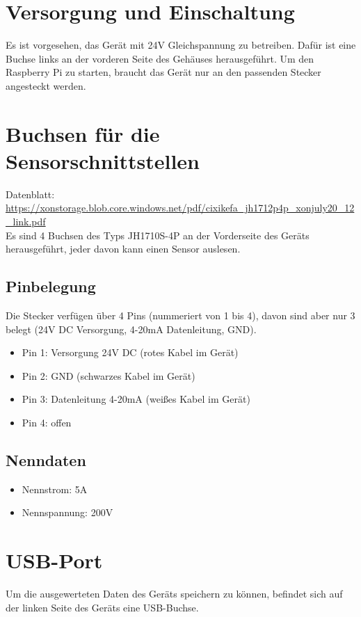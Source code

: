 \section{Versorgung und Einschaltung}

Es ist vorgesehen, das Gerät mit 24V Gleichspannung zu betreiben.
Dafür ist eine Buchse links an der vorderen Seite des Gehäuses herausgeführt.
Um den Raspberry Pi zu starten, braucht das Gerät nur an den passenden Stecker angesteckt werden.

\section{Buchsen für die Sensorschnittstellen}

Datenblatt: \url{https://xonstorage.blob.core.windows.net/pdf/cixikefa_jh1712p4p_xonjuly20_12_link.pdf}\\[0.5cm]
Es sind 4 Buchsen des Typs JH1710S-4P an der Vorderseite des Geräts herausgeführt, jeder davon kann einen Sensor auslesen.

\subsection{Pinbelegung}
Die Stecker verfügen über 4 Pins (nummeriert von 1 bis 4), davon sind aber nur 3  belegt (24V DC Versorgung, 4-20mA Datenleitung, GND).

\begin{itemize}
    \item Pin 1: Versorgung 24V DC (rotes Kabel im Gerät)
    \item Pin 2: GND (schwarzes Kabel im Gerät)
    \item Pin 3: Datenleitung 4-20mA (weißes Kabel im Gerät)
    \item Pin 4: offen
\end{itemize}



\subsection{Nenndaten}

\begin{itemize}
    \item Nennstrom: 5A
    \item Nennspannung: 200V
\end{itemize}

\section{USB-Port}
Um die ausgewerteten Daten des Geräts speichern zu können, befindet sich auf der linken Seite des Geräts eine USB-Buchse.

